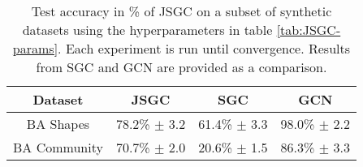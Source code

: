 \begin{table}[h]
    \centering
    \captionsetup{width=.9\textwidth}
    \begin{tabular}{c|c|cc}
        \textbf{Dataset} & \textbf{JSGC} & \textbf{SGC} & \textbf{GCN} \\
        \midrule
        BA Shapes       & 78.2\% $\pm$ 3.2 & 61.4\% $\pm$ 3.3 & 98.0\% $\pm$ 2.2 \\
        BA Community    & 70.7\% $\pm$ 2.0 & 20.6\% $\pm$ 1.5 & 86.3\% $\pm$ 3.3 \\
    \end{tabular}
    \caption{Test accuracy in \% of JSGC on a subset of synthetic datasets using the hyperparameters in table \ref{tab:JSGC-params}. Each experiment is run until convergence. Results from SGC and GCN are provided as a comparison.}
    \label{tab:JSGC-acc}
\end{table}


